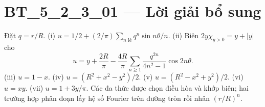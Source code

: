 \documentclass[10pt,a4paper]{article}
\begin{document}
\section*{BT\_5\_2\_3\_01 — Lời giải bổ sung}
Đặt $q=r/R$. (i) $u=1/2+(2/\pi)\sum_{n\text{ lẻ}}q^n\sin n\theta/n$.
(ii) Biên $2y\chi_{y>0}=y+|y|$ cho
\[u=y+\frac{2R}\pi-\frac{4R}\pi\sum_{n\ge1}\frac{q^{2n}}{4n^2-1}\cos2n\theta.\]
(iii) $u=1-x$.
(iv) $u=(R^2+x^2-y^2)/2$.
(v) $u=(R^2-x^2+y^2)/2$.
(vi) $u=xy$.
(vii) $u=1+3y/\pi$.
Các đa thức được chọn điều hòa và khớp biên; hai trường hợp phân đoạn lấy hệ số Fourier trên đường tròn rồi nhân $(r/R)^n$.
\end{document}
